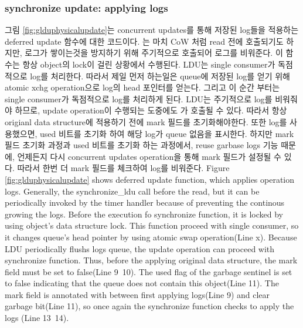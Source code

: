 \subsubsection{synchronize update: applying logs}



\ifkor
그림 \ref{fig:glduphysicalupdate}는 concurrent updates를 통해 저장된 log들을 적용하는 deferred
update 함수에 대한 코드이다.
는 마치 CoW 처럼 read 전에 호출되기도 하지만, 로그가 쌓이는것을 방지하기 위해 주기적으로
호출되어 로그를 비워준다.
이 함수는 항상 object의 lock이 걸린 상황에서 수행된다. 
LDU는 single consumer가 독점적으로 log를 처리한다.
따라서 제일 먼저 하는일은 queue에 저장된 log를 얻기 위해 atomic xchg operation으로 log의 head 포인터를
얻는다.
그리고 이 순간 부터는 single consumer가 독점적으로 log를 처리하게 된다.
LDU는 주기적으로 log를 비워줘야 하므로, update operation이 수행되는 도중에도 가
호출될 수 있다.
따라서 항상 origianl data structure에 적용하기 전에 mark 필드를 초기화해야한다.
또한 log를 사용했으면, used 비트를 초기화 하여 해당 log가 queue 없음을 표시한다.
하지만 mark 필드 초기화 과정과 used 비트를 초기화 하는 과정에서, reuse garbase logs 기능 때문에,
언제든지 다시 concurrent updates operation을 통해 mark 필드가 설정될 수 있다.
따라서 한번 더 mark 필드를 체크하여 log를 비워준다.
\else
Figure \ref{fig:glduphysicalupdate} shows deferred update function, which
applies operation logs.
Generally, the synchronize\_ldu call before the read, but it can be periodically
invoked by the timer handler because of preventing the continous growing the
logs.
Before the execution fo synchronize function, it is locked by using object's
data structure lock.
This function proceed with single consumer, so it changes queue's head pointer
by using atomic swap operation(Line x).
Because LDU periodically flushs logs queue, the update operation can proceed
with synchronize function.
Thus, before the applying original data structure, the mark field must be set
to false(Line 9~10).
The used flag of the garbage sentinel is set to false indicating that the queue
does not contain this object(Line 11).
The mark field is annotated with between first applying logs(Line 9) and clear
garbage bit(Line 11), so once again the synchronize function checks to apply the
logs (Line 13~14).
\fi

